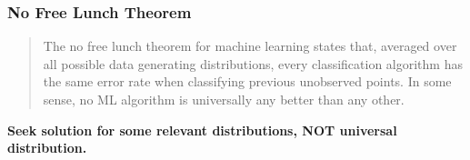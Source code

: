 \documentclass{beamer}
\begin{document}
\begin{frame}
  \frametitle{No Free Lunch Theorem}

  \begin{quote}
    The no free lunch theorem for machine learning \cite{Wolpert:1996} states that, averaged over all possible data generating distributions, every classification algorithm has the same error rate when classifying previous unobserved points. In some sense, no ML algorithm is universally any better than any other.
  \end{quote}

  \centering
  \textbf{Seek solution for some relevant distributions, NOT universal distribution.}
\end{frame}

%

%
\end{document}
